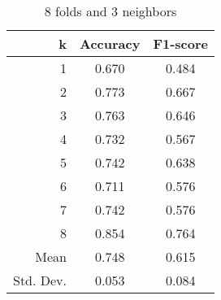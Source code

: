 \begin{table}
\centering
\caption{8 folds and 3 neighbors}
\begin{tabular}{rcc}
\toprule
         k &  Accuracy &  F1-score \\
\midrule
         1 &     0.670 &     0.484 \\
         2 &     0.773 &     0.667 \\
         3 &     0.763 &     0.646 \\
         4 &     0.732 &     0.567 \\
         5 &     0.742 &     0.638 \\
         6 &     0.711 &     0.576 \\
         7 &     0.742 &     0.576 \\
         8 &     0.854 &     0.764 \\
      Mean &     0.748 &     0.615 \\
 Std. Dev. &     0.053 &     0.084 \\
\bottomrule
\end{tabular}
\end{table}
